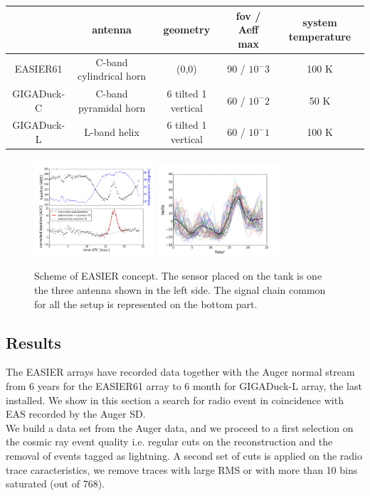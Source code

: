\documentclass{PoS}
\begin{document}
\begin{center}
  \begin{tabular}{ | c | c | c | c | c |}
    \hline
	& antenna & geometry & fov / Aeff max & system temperature \\ \hline
	EASIER61 & C-band cylindrical horn & (0,0) & 90 / $10^-3$ & 100 K\\ \hline
	GIGADuck-C & C-band pyramidal horn & 6 tilted 1 vertical  & 60 / $10^-2$ & 50 K\\ \hline
	GIGADuck-L & L-band helix & 6 tilted 1 vertical  & 60 / $10^-1$ & 100 K\\ \hline
  \end{tabular}
\end{center}
\begin{figure}[h]
\centering
\includegraphics[width=0.4\textwidth]{newfitexamp.png}
\includegraphics[width=0.4\textwidth]{jorgehour.png}

\caption{Scheme of EASIER concept. The sensor  placed on the tank is one the three antenna shown in the left side. The signal chain common for all the setup is represented on the bottom part.}
\label{fig:baselines}
\end{figure}
\subsection{Results}
The EASIER arrays have recorded data together with the Auger normal stream from 6 years for the EASIER61 array to 6 month for GIGADuck-L array, the last installed. We show in this section a search for radio event in coincidence with EAS recorded by the Auger SD.\\We build a data set from the Auger data, and we proceed to a first selection on the cosmic ray event quality i.e. regular cuts on the reconstruction and the removal of events tagged as lightning. A second set of cuts is applied on the radio trace caracteristics, we remove traces with large RMS or with more than 10 bins saturated (out of 768). 
\end{document}
